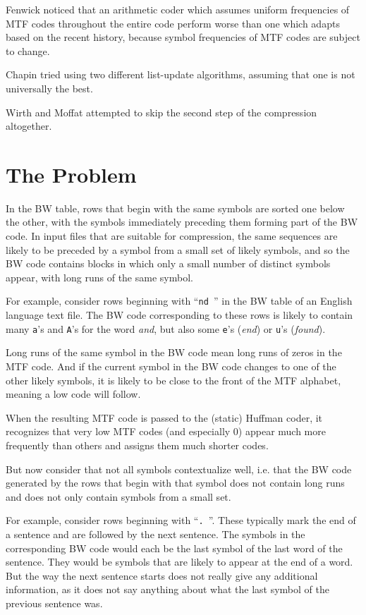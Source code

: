 \documentclass[a4paper]{scrreprt}
\begin{document}
Fenwick\cite{fenwick1996block} noticed that an arithmetic coder which assumes
uniform frequencies of MTF codes throughout the entire code perform worse than
one which adapts based on the recent history, because symbol frequencies of MTF
codes are subject to change.

Chapin\cite{chapin2000switching,chapin2001diss} tried using two different
list-update algorithms, assuming that one is not universally the best.

Wirth and Moffat\cite{wirth2001ranks} attempted to skip the second step of the
compression altogether.

\section{The Problem}

In the BW table, rows that begin with the same symbols are sorted one below the
other, with the symbols immediately preceding them forming part of the BW code.
In input files that are suitable for compression, the same sequences are likely
to be preceded by a symbol from a small set of likely symbols, and so the BW
code contains blocks in which only a small number of distinct symbols appear,
with long runs of the same symbol.

For example, consider rows beginning with ``\texttt{nd }'' in the BW table of an
English language text file. The BW code corresponding to these rows is likely to
contain many \texttt{a}'s and \texttt{A}'s for the word \emph{and}, but also
some \texttt{e}'s (\emph{end}) or \texttt{u}'s (\emph{found}).

Long runs of the same symbol in the BW code mean long runs of zeros in the MTF
code. And if the current symbol in the BW code changes to one of the other
likely symbols, it is likely to be close to the front of the MTF alphabet,
meaning a low code will follow.

When the resulting MTF code is passed to the (static) Huffman coder, it
recognizes that very low MTF codes (and especially 0) appear much more
frequently than others and assigns them much shorter codes.

But now consider that not all symbols contextualize well, i.e. that the BW code
generated by the rows that begin with that symbol does not contain long runs and
does not only contain symbols from a small set.

For example, consider rows beginning with ``\texttt{. }''. These typically mark
the end of a sentence and are followed by the next sentence. The symbols in the
corresponding BW code would each be the last symbol of the last word of the
sentence. They would be symbols that are likely to appear at the end of a
word. But the way the next sentence starts does not really give any additional
information, as it does not say anything about what the last symbol of the
previous sentence was.
\end{document}
